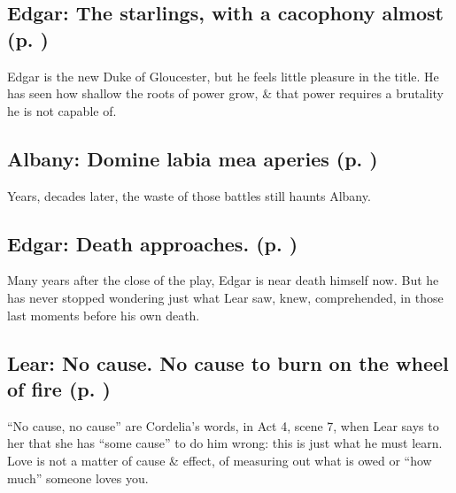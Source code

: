 \subsection{Edgar: The starlings, with a cacophony almost (p. \pageref{ch:lear_bs})}
Edgar is the new Duke of Gloucester, but he feels little pleasure in the title. He has seen how shallow the roots of power grow, \& that power requires a brutality he is not capable of.

\subsection{Albany: Domine labia mea aperies (p. \pageref{ch:lear_bt})}
Years, decades later, the waste of those battles still haunts Albany.

\subsection{Edgar: Death approaches. (p. \pageref{ch:lear_bu})}
Many years after the close of the play, Edgar is near death himself now. But he has never stopped wondering just what Lear saw, knew, comprehended, in those last moments before his own death.

\subsection{Lear: No cause. No cause to burn on the wheel of fire (p. \pageref{ch:lear_bv})}
``No cause, no cause'' are Cordelia's words, in Act 4, scene 7, when Lear says to her that she has ``some cause'' to do him wrong: this is just what he must learn. Love is not a matter of cause \& effect, of measuring out what is owed or ``how much'' someone loves you.